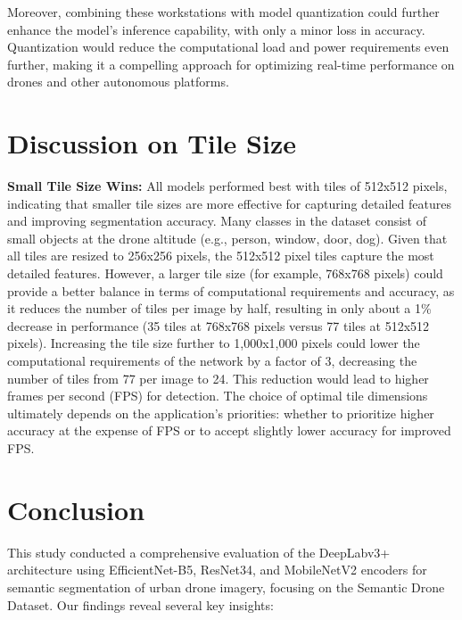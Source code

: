 \documentclass[a4paper]{article}
\begin{document}
Moreover, combining these workstations with model quantization could further enhance the model’s inference capability, with only a minor loss in accuracy. Quantization would reduce the computational load and power requirements even further, making it a compelling approach for optimizing real-time performance on drones and other autonomous platforms.

\section{Discussion on Tile Size}
\textbf{Small Tile Size Wins:} All models performed best with tiles of 512x512 pixels, indicating that smaller tile sizes are more effective for capturing detailed features and improving segmentation accuracy. Many classes in the dataset consist of small objects at the drone altitude (e.g., person, window, door, dog). Given that all tiles are resized to 256x256 pixels, the 512x512 pixel tiles capture the most detailed features. However, a larger tile size (for example, 768x768 pixels) could provide a better balance in terms of computational requirements and accuracy, as it reduces the number of tiles per image by half, resulting in only about a 1\% decrease in performance (35 tiles at 768x768 pixels versus 77 tiles at 512x512 pixels). Increasing the tile size further to 1,000x1,000 pixels could lower the computational requirements of the network by a factor of 3, decreasing the number of tiles from 77 per image to 24. This reduction would lead to higher frames per second (FPS) for detection. The choice of optimal tile dimensions ultimately depends on the application's priorities: whether to prioritize higher accuracy at the expense of FPS or to accept slightly lower accuracy for improved FPS.

\section{Conclusion}
This study conducted a comprehensive evaluation of the DeepLabv3+ architecture using EfficientNet-B5, ResNet34, and MobileNetV2 encoders for semantic segmentation of urban drone imagery, focusing on the Semantic Drone Dataset. Our findings reveal several key insights:
\end{document}
